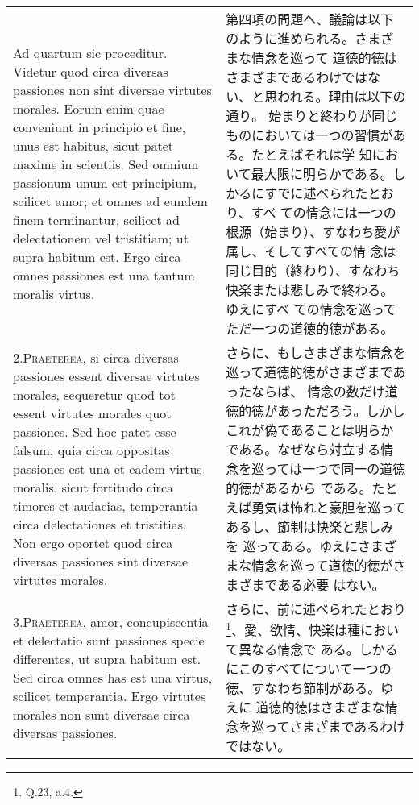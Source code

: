 \documentclass[10pt]{jsarticle}
\begin{document}
\begin{longtable}{p{21em}p{21em}}
 Ad quartum sic proceditur. Videtur quod circa diversas passiones non
 sint diversae virtutes morales. Eorum enim quae conveniunt in
 principio et fine, unus est habitus, sicut patet maxime in
 scientiis. Sed omnium passionum unum est principium, scilicet amor;
 et omnes ad eundem finem terminantur, scilicet ad delectationem vel
 tristitiam; ut supra habitum est. Ergo circa omnes passiones est una
 tantum moralis virtus.

 
&

 第四項の問題へ、議論は以下のように進められる。さまざまな情念を巡って
 道徳的徳はさまざまであるわけではない、と思われる。理由は以下の通り。
 始まりと終わりが同じものにおいては一つの習慣がある。たとえばそれは学
 知において最大限に明らかである。しかるにすでに述べられたとおり、すべ
 ての情念には一つの根源（始まり）、すなわち愛が属し、そしてすべての情
 念は同じ目的（終わり）、すなわち快楽または悲しみで終わる。ゆえにすべ
 ての情念を巡ってただ一つの道徳的徳がある。
 
\\

2.{\scshape Praeterea}, si circa diversas passiones essent diversae
virtutes morales, sequeretur quod tot essent virtutes morales quot
passiones. Sed hoc patet esse falsum, quia circa oppositas passiones
est una et eadem virtus moralis, sicut fortitudo circa timores et
audacias, temperantia circa delectationes et tristitias. Non ergo
oportet quod circa diversas passiones sint diversae virtutes morales.

 
&

 さらに、もしさまざまな情念を巡って道徳的徳がさまざまであったならば、
 情念の数だけ道徳的徳があっただろう。しかしこれが偽であることは明らか
 である。なぜなら対立する情念を巡っては一つで同一の道徳的徳があるから
 である。たとえば勇気は怖れと豪胆を巡ってあるし、節制は快楽と悲しみを
 巡ってある。ゆえにさまざまな情念を巡って道徳的徳がさまざまである必要
 はない。

 
\\




3.{\scshape Praeterea}, amor, concupiscentia et delectatio sunt
passiones specie differentes, ut supra habitum est. Sed circa omnes
has est una virtus, scilicet temperantia. Ergo virtutes morales non
sunt diversae circa diversas passiones.
 
&

 さらに、前に述べられたとおり\footnote{Q.23, a.4.}、愛、欲情、快楽は種において異なる情念で
 ある。しかるにこのすべてについて一つの徳、すなわち節制がある。ゆえに
 道徳的徳はさまざまな情念を巡ってさまざまであるわけではない。


\end{longtable}
\end{document}
